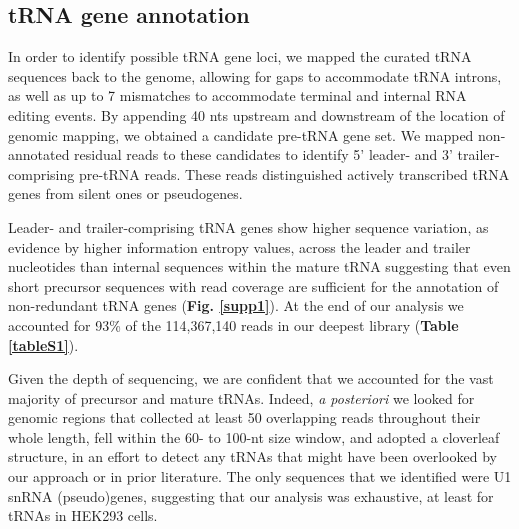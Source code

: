 \documentclass[12pt]{rockefeller}
\begin{document}
\subsection{tRNA gene annotation}
In order to identify possible tRNA gene loci, we mapped the curated tRNA sequences back to the genome, allowing for gaps to accommodate tRNA introns, as well as up to 7 mismatches to accommodate terminal and internal RNA editing events. By appending 40 nts upstream and downstream of the location of genomic mapping, we obtained a candidate pre-tRNA gene set. We mapped non-annotated residual reads to these candidates to identify 5’ leader- and 3’ trailer-comprising pre-tRNA reads. These reads distinguished actively transcribed tRNA genes from silent ones or pseudogenes.

Leader- and trailer-comprising tRNA genes show higher sequence variation, as evidence by higher information entropy values, across the leader and trailer nucleotides than internal sequences within the mature tRNA suggesting that even short precursor sequences with read coverage are sufficient for the annotation of non-redundant tRNA genes (\textbf{Fig. \ref{supp1}}). At the end of our analysis we accounted for 93\% of the 114,367,140 reads in our deepest library (\textbf{Table \ref{tableS1}}).

Given the depth of sequencing, we are confident that we accounted for the vast majority of precursor and mature tRNAs. Indeed, \textit{a posteriori} we looked for genomic regions that collected at least 50 overlapping reads throughout their whole length, fell within the 60- to 100-nt size window, and adopted a cloverleaf structure, in an effort to detect any tRNAs that might have been overlooked by our approach or in prior literature. The only sequences that we identified were U1 snRNA (pseudo)genes, suggesting that our analysis was exhaustive, at least for tRNAs in HEK293 cells. 
\end{document}
